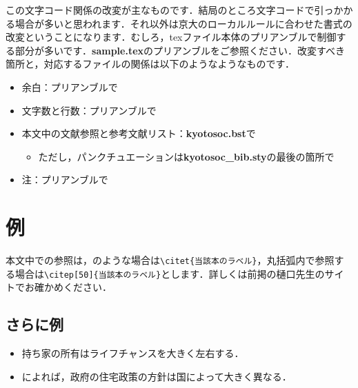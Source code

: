 \documentclass[b5paper, titlepage, 11pt]{jsarticle}
\begin{document}
この文字コード関係の改変が主なものです．結局のところ文字コードで引っかかる場合が多いと思われます．それ以外は京大のローカルルールに合わせた書式の改変ということになります．むしろ，texファイル本体のプリアンブルで制御する部分が多いです．\textbf{sample.tex}のプリアンブルをご参照ください．改変すべき箇所と，対応するファイルの関係は以下のようなようなものです．

\begin{itemize}
    \item 余白：プリアンブルで
    \item 文字数と行数：プリアンブルで
    \item 本文中の文献参照と参考文献リスト：\textbf{kyotosoc.bst}で
        \begin{itemize}
            \item ただし，パンクチュエーションは\textbf{kyotosoc\_bib.sty}の最後の箇所で
        \end{itemize}
    \item 注：プリアンブルで
\end{itemize}

\section{例}
本文中での参照は，\citet{平山洋介2018富か}のような場合は\verb|\citet{当該本のラベル}|，丸括弧内で参照する場合\citep[50]{平山2009}は\verb|\citep[50]{当該本のラベル}|とします．詳しくは前掲の樋口先生のサイトでお確かめください．

\subsection{さらに例}

\begin{itemize}
    \item 持ち家の所有はライフチャンスを大きく左右する\citep{zavisca_socioeconomic_2016}．
    \item \citet{schwartz2009}によれば，政府の住宅政策の方針は国によって大きく異なる．
\end{itemize}



\end{document}

